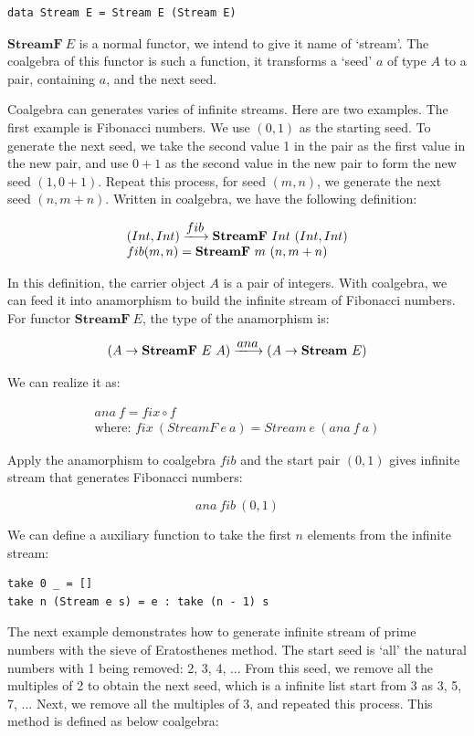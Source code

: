 \documentclass{article}
\begin{document}
\begin{lstlisting}
data Stream E = Stream E (Stream E)
\end{lstlisting}

$\mathbf{StreamF}\ E$ is a normal functor, we intend to give it name of `stream'. The coalgebra of this functor is such a function, it transforms a `seed' $a$ of type $A$ to a pair, containing $a$, and the next seed.

Coalgebra can generates varies of infinite streams. Here are two examples. The first example is Fibonacci numbers. We use $(0, 1)$ as the starting seed. To generate the next seed, we take the second value 1 in the pair as the first value in the new pair, and use $0 + 1$ as the second value in the new pair to form the new seed $(1, 0 + 1)$. Repeat this process, for seed $(m, n)$, we generate the next seed $(n, m + n)$. Written in coalgebra, we have the following definition:

\[
\begin{array}{l}
(Int, Int) \arrowto{fib} \mathbf{StreamF}\ Int\ (Int, Int) \\
fib (m, n) = \mathbf{StreamF}\ m\ (n, m + n)
\end{array}
\]

In this definition, the carrier object $A$ is a pair of integers. With coalgebra, we can feed it into anamorphism to build the infinite stream of Fibonacci numbers. For functor $\mathbf{StreamF}\ E$, the type of the anamorphism is:

\[
(A \to \mathbf{StreamF}\ E\ A) \arrowto{ana} (A \to \mathbf{Stream}\ E)
\]

We can realize it as:

\[
\begin{array}{l}
ana\ f = fix \circ f \\
\text{where: } fix\ (StreamF\ e\ a) = Stream\ e\ (ana\ f\ a)
\end{array}
\]

Apply the anamorphism to coalgebra $fib$ and the start pair $(0, 1)$ gives infinite stream that generates Fibonacci numbers:

\[
ana\ fib\ (0, 1)
\]

We can define a auxiliary function to take the first $n$ elements from the infinite stream:

\begin{lstlisting}
take 0 _ = []
take n (Stream e s) = e : take (n - 1) s
\end{lstlisting}

The next example demonstrates how to generate infinite stream of prime numbers with the sieve of Eratosthenes method. The start seed is `all' the natural numbers with 1 being removed: 2, 3, 4, ... From this seed, we remove all the multiples of 2 to obtain the next seed, which is a infinite list start from 3 as 3, 5, 7, ... Next, we remove all the multiples of 3, and repeated this process. This method is defined as below coalgebra:
\end{document}
